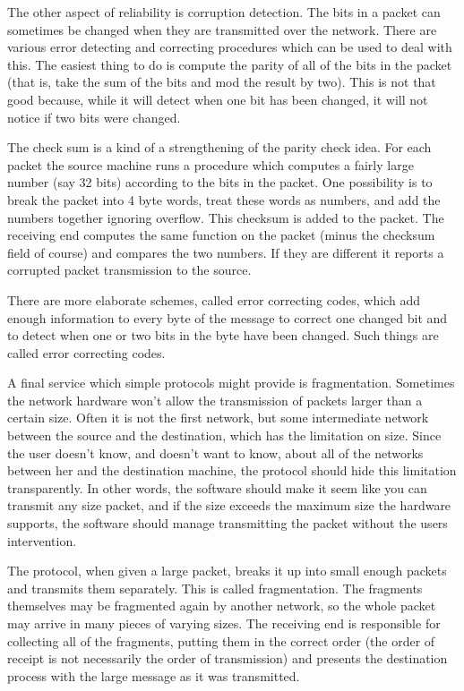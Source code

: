 The other aspect of reliability is corruption detection.  The bits in a
packet can sometimes be changed when they are transmitted over the network.
There are various error detecting and correcting procedures which can be used
to deal with this.  The easiest thing to do is compute the parity of all of
the bits in the packet (that is, take the sum of the bits and mod the result
by two).  This is not that good because, while it will detect when one bit
has been changed, it will not notice if two bits were changed.

The check sum is a kind of a strengthening of the parity check idea.
For each
packet the source machine runs a procedure which computes a fairly large
number
(say 32 bits) according to the bits in the packet.  One possibility is to
break the packet into 4 byte words, treat these words as numbers, and add
the numbers together ignoring overflow.  This checksum is added to the packet.
The receiving end computes the same function on the packet (minus the checksum
field of course) and compares the two numbers.  If they are different it
reports a corrupted packet transmission to the source.

There are more elaborate schemes, called error correcting codes, which
add enough information to every byte of the message to correct
one changed bit and to
detect when one or two bits in the byte have been changed.
Such things are called error correcting codes.

A final service which simple protocols might provide is fragmentation.
Sometimes the network hardware won't allow the transmission of packets
larger than a certain size.  Often it is not the first network, but some
intermediate network between the source and the destination, which has
the  limitation on size.  Since the user doesn't know, and doesn't want
to know, about all of the networks between her and the destination
machine, the protocol should hide this limitation transparently.
In other words, the software should make it seem like you can transmit
any size packet, and if the size exceeds the maximum size the hardware
supports, the software should manage transmitting the packet without
the users intervention.

The protocol, when given a large packet, breaks it up into small enough
packets and transmits them separately.  This is called fragmentation.
The fragments
themselves may be fragmented again by another network, so the whole
packet may arrive in many pieces of varying sizes.
The receiving end is responsible
for collecting all of the fragments, putting them in the correct order
(the order of receipt is not necessarily the order of transmission) and
presents the destination process with the large message as it was
transmitted.

